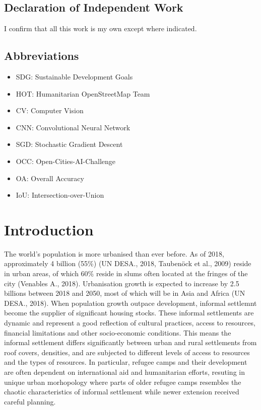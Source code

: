 \documentclass[11pt, a4paper, twoside]{report}
\begin{document}
\newpage
\section{Declaration of Independent Work}

I confirm that all this work is my own except where indicated.
\newpage


\tableofcontents

\newpage

\listoffigures

\newpage

\listoftables
\clearpage

\newpage

\section{Abbreviations}

\begin{itemize}
  \item SDG: Sustainable Development Goals
  \item HOT: Humanitarian OpenStreetMap Team
  \item CV: Computer Vision
  \item CNN: Convolutional Neural Network
  \item SGD: Stochastic Gradient Descent
  \item OCC: Open-Cities-AI-Challenge
  \item OA: Overall Accuracy
  \item IoU: Intersection-over-Union
\end{itemize}

\newpage

\chapter{Introduction}\label{Intro}

The world’s population is more urbanised than ever before. As of 2018, approximately 4 billion (55\%) (UN DESA., 2018, Taubenöck et al., 2009) reside in urban areas, of which 60\% reside in slums often located at the fringes of the city (Venables A., 2018). Urbanisation growth is expected to increase by 2.5 billions between 2018 and 2050, most of which will be in Asia and Africa (UN DESA., 2018). When population growth outpace development, informal settlemnt become the supplier of significant housing stocks. These informal settlements are dynamic and represent a good reflection of cultural practices, access to resources, financial limitations and other socio-economic conditions. This means the informal settlement differs significantly between urban and rural settlements from roof covers, densities, and are subjected to different levels of access to resources and the types of resources. In particular, refugee camps and their development are often dependent on international aid and humanitarian efforts, resuting in unique urban morhopology where parts of older refugee camps resembles the chaotic characteristics of informal settlement while newer extension received careful planning.\\\par
\end{document}
